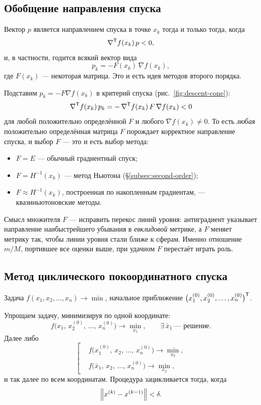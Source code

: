 \subsection{Обобщение направления спуска}
\label{subsec:descent-direction}

\begin{remark}
Вектор $p$ является направлением спуска в точке $x_k$ тогда и только тогда,
когда
\[
  \nabla^{\mathsf{T}} f(x_k)\, p < 0 ,
\]
и, в частности, годится всякий вектор вида
\[
  p_k = -F(x_k)\, \nabla f(x_k) ,
\]
где $F(x_k)$ — некоторая матрица. Это и есть идея методов второго порядка.
\end{remark}

\begin{idea}[title={Откуда берётся вид $p_k = -F \nabla f$}]
Подставим $p_k = -F \nabla f(x_k)$ в критерий спуска (рис.~\ref{fig:descent-cone}):
\[
  \nabla^{\mathsf{T}} f(x_k)\, p_k = -\,\nabla^{\mathsf{T}} f(x_k)\, F\, \nabla f(x_k) < 0
\]
для любой положительно определённой $F$ и любого $\nabla f(x_k) \ne 0$.
То есть \emph{любая} положительно определённая
матрица $F$ порождает корректное направление спуска, и выбор $F$ — это и есть
выбор метода:
\begin{itemize}[nosep,left=0pt]
  \item $F = E$ — обычный градиентный спуск;
  \item $F = H^{-1}(x_k)$ — метод Ньютона (\S\ref{subsec:second-order});
  \item $F \approx H^{-1}(x_k)$, построенная по накопленным градиентам, —
        квазиньютоновские методы.
\end{itemize}
Смысл множителя $F$ — исправить перекос линий уровня: антиградиент указывает
направление наибыстрейшего убывания в \emph{евклидовой} метрике, а $F$ меняет
метрику так, чтобы линии уровня стали ближе к сферам. Именно отношение $m/M$,
портившее все оценки выше, при удачном $F$ перестаёт играть роль.
\end{idea}

\subsection{Метод циклического покоординатного спуска}

Задача $f(x_1, x_2, \dots, x_n) \to \min$, начальное приближение
$\big(x_1^{(0)}, x_2^{(0)}, \dots, x_n^{(0)}\big)^{\mathsf{T}}$.

Упрощаем задачу, минимизируя по одной координате:
\[
  f\big(x_1,\, x_2^{(0)},\, \dots,\, x_n^{(0)}\big) \to \min_{x_1} ,
  \qquad \exists\, \bar{x}_1 \ \text{— решение} .
\]
Далее либо
\[
  \left[
  \begin{aligned}
    &f\big(x_1^{(0)},\, x_2,\, \dots,\, x_n^{(0)}\big) \to \min_{x_2} , \\
    &f\big(\bar{x}_1,\, x_2,\, \dots,\, x_n^{(0)}\big) \to \min_{x_2} ,
  \end{aligned}
  \right.
\]
и так далее по всем координатам. Процедура зацикливается тогда, когда
\[
  \left\lVert x^{(k)} - x^{(k-1)} \right\rVert < \delta .
\]

